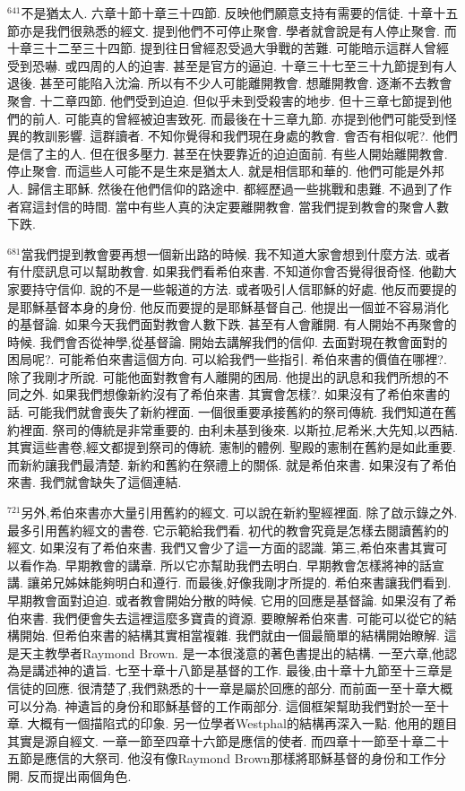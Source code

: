 \documentclass{book}
\begin{document}
$^{641}$不是猶太人.
六章十節十章三十四節.
反映他們願意支持有需要的信徒.
十章十五節亦是我們很熟悉的經文.
提到他們不可停止聚會.
學者就會說是有人停止聚會.
而十章三十二至三十四節.
提到往日曾經忍受過大爭戰的苦難.
可能暗示這群人曾經受到恐嚇.
或四周的人的迫害.
甚至是官方的逼迫.
十章三十七至三十九節提到有人退後.
甚至可能陷入沈淪.
所以有不少人可能離開教會.
想離開教會.
逐漸不去教會聚會.
十二章四節.
他們受到迫迫.
但似乎未到受殺害的地步.
但十三章七節提到他們的前人.
可能真的曾經被迫害致死.
而最後在十三章九節.
亦提到他們可能受到怪異的教訓影響.
這群讀者.
不知你覺得和我們現在身處的教會.
會否有相似呢?.
他們是信了主的人.
但在很多壓力.
甚至在快要靠近的迫迫面前.
有些人開始離開教會.
停止聚會.
而這些人可能不是生來是猶太人.
就是相信耶和華的.
他們可能是外邦人.
歸信主耶穌.
然後在他們信仰的路途中.
都經歷過一些挑戰和患難.
不過到了作者寫這封信的時間.
當中有些人真的決定要離開教會.
當我們提到教會的聚會人數下跌.

$^{681}$當我們提到教會要再想一個新出路的時候.
我不知道大家會想到什麼方法.
或者有什麼訊息可以幫助教會.
如果我們看希伯來書.
不知道你會否覺得很奇怪.
他勸大家要持守信仰.
說的不是一些報道的方法.
或者吸引人信耶穌的好處.
他反而要提的是耶穌基督本身的身份.
他反而要提的是耶穌基督自己.
他提出一個並不容易消化的基督論.
如果今天我們面對教會人數下跌.
甚至有人會離開.
有人開始不再聚會的時候.
我們會否從神學,從基督論.
開始去講解我們的信仰.
去面對現在教會面對的困局呢?.
可能希伯來書這個方向.
可以給我們一些指引.
希伯來書的價值在哪裡?.
除了我剛才所說.
可能他面對教會有人離開的困局.
他提出的訊息和我們所想的不同之外.
如果我們想像新約沒有了希伯來書.
其實會怎樣?.
如果沒有了希伯來書的話.
可能我們就會喪失了新約裡面.
一個很重要承接舊約的祭司傳統.
我們知道在舊約裡面.
祭司的傳統是非常重要的.
由利未基到後來.
以斯拉,尼希米,大先知,以西結.
其實這些書卷,經文都提到祭司的傳統.
憲制的體例.
聖殿的憲制在舊約是如此重要.
而新約讓我們最清楚.
新約和舊約在祭禮上的關係.
就是希伯來書.
如果沒有了希伯來書.
我們就會缺失了這個連結.

$^{721}$另外,希伯來書亦大量引用舊約的經文.
可以說在新約聖經裡面.
除了啟示錄之外.
最多引用舊約經文的書卷.
它示範給我們看.
初代的教會究竟是怎樣去閱讀舊約的經文.
如果沒有了希伯來書.
我們又會少了這一方面的認識.
第三,希伯來書其實可以看作為.
早期教會的講章.
所以它亦幫助我們去明白.
早期教會怎樣將神的話宣講.
讓弟兄姊妹能夠明白和遵行.
而最後,好像我剛才所提的.
希伯來書讓我們看到.
早期教會面對迫迫.
或者教會開始分散的時候.
它用的回應是基督論.
如果沒有了希伯來書.
我們便會失去這裡這麼多寶貴的資源.
要瞭解希伯來書.
可能可以從它的結構開始.
但希伯來書的結構其實相當複雜.
我們就由一個最簡單的結構開始瞭解.
這是天主教學者Raymond Brown.
是一本很淺意的著色書提出的結構.
一至六章,他認為是講述神的遺旨.
七至十章十八節是基督的工作.
最後,由十章十九節至十三章是信徒的回應.
很清楚了,我們熟悉的十一章是屬於回應的部分.
而前面一至十章大概可以分為.
神遺旨的身份和耶穌基督的工作兩部分.
這個框架幫助我們對於一至十章.
大概有一個描陷式的印象.
另一位學者Westphal的結構再深入一點.
他用的題目其實是源自經文.
一章一節至四章十六節是應信的使者.
而四章十一節至十章二十五節是應信的大祭司.
他沒有像Raymond Brown那樣將耶穌基督的身份和工作分開.
反而提出兩個角色.
\end{document}
